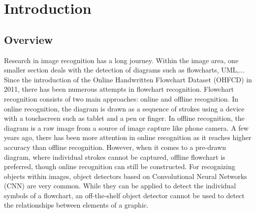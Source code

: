 \chapter{Introduction} \label{introduction}
\section{Overview}
Research in image recognition has a long journey. Within the image area, one smaller section deals with the detection of diagrams such as flowcharts, UML,... Since the introduction of the Online Handwritten Flowchart Dataset (OHFCD) in 2011, there has been numerous attempts in flowchart recognition. Flowchart recognition consists of two main approaches: online and offline recognition. In online recognition, the diagram is drawn as a sequence of strokes using a device with a touchscreen such as tablet and a pen or finger. In offline recognition, the diagram is a raw image from a source of image capture like phone camera. A few years ago, there has been more attention in online recognition as it reaches higher accuracy than offline recognition. However, when it comes to a pre-drawn diagram, where individual strokes cannot be captured, offline flowchart is preferred, though online recognition can still be constructed. For recognizing objects within images, object detectors based on Convolutional Neural Networks (CNN) are very common. While they can be applied to detect the individual symbols of a flowchart, an off-the-shelf object detector cannot be used to detect the relationships between elements of a graphic.

